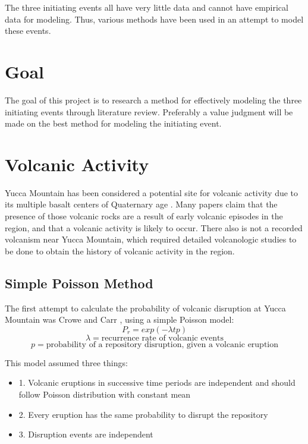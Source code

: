 \documentclass[12pt]{article}
\begin{document}
The three initiating events all have very little data
and cannot have empirical data for modeling. Thus,
various methods have been used in an attempt to model these events.

\section{Goal}
The goal of this project is to research a method for effectively
modeling the three initiating events through literature review.
Preferably a value judgment will be made on the best method
for modeling the initiating event. 

\FloatBarrier



\section{Volcanic Activity}
Yucca Mountain has been considered a potential site
for volcanic activity due to its multiple basalt centers 
of Quaternary age \cite{management_environmental_1986}.
Many papers \cite{crowe_volcanism:_2006, crowe_status_1995}claim that
the presence of those volcanic rocks are a result of early volcanic episodes in the region,
and that a volcanic activity is likely to occur.
There also is not a recorded volcanism near Yucca Mountain, which required
detailed volcanologic studies to be done to obtain the history of 
volcanic activity in the region.

\subsection{Simple Poisson Method}
The first attempt to calculate the probability of volcanic disruption
at Yucca Mountain was Crowe and Carr \cite{crowe_preliminary_1980}, using 
a simple Poisson model:
\[P_r = exp(-\lambda t p)\]
\[\lambda = \text{recurrence rate of volcanic events}\]
\[p = \text{probability of a repository disruption, given a volcanic eruption}\]

This model assumed three things:

\begin{itemize}
    \item 1. Volcanic eruptions in successive time periods are independent
     and should follow Poisson distribution with constant mean\\
    \item 2. Every eruption has the same probability to disrupt the repository \\
    \item 3. Disruption events are independent \\
\end{itemize}
\end{document}
